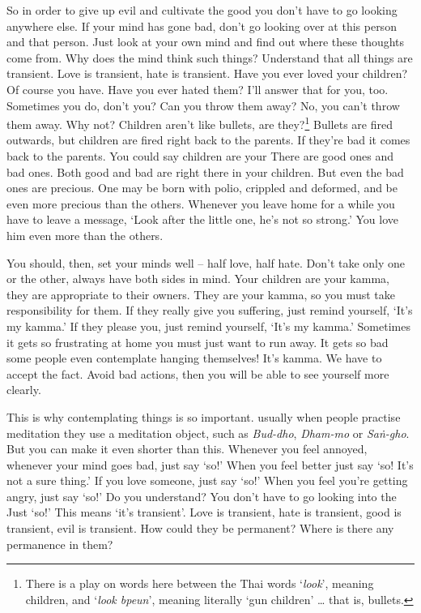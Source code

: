 So in order to give up evil and cultivate the good you don't have to go looking anywhere else. If your mind has gone bad, don't go looking over at this person and that person. Just look at your own mind and find out where these thoughts come from. Why does the mind think such things? Understand that all things are transient. Love is transient, hate is transient. Have you ever loved your children? Of course you have. Have you ever hated them? I'll answer that for you, too. Sometimes you do, don't you? Can you throw them away? No, you can't throw them away. Why not? Children aren't like bullets, are they?\footnote{There is a play on words here between the Thai words `\textit{look}', meaning children, and `\textit{look bpeun}', meaning literally `gun children' \ldots{} that is, bullets.} Bullets are fired outwards, but children are fired right back to the parents. If they're bad it comes back to the parents. You could say children are your  There are good ones and bad ones. Both good and bad are right there in your children. But even the bad ones are precious. One may be born with polio, crippled and deformed, and be even more precious than the others. Whenever you leave home for a while you have to leave a message, `Look after the little one, he's not so strong.' You love him even more than the others.

You should, then, set your minds well -- half love, half hate. Don't take only one or the other, always have both sides in mind. Your children are your kamma, they are appropriate to their owners. They are your kamma, so you must take responsibility for them. If they really give you suffering, just remind yourself, `It's my kamma.' If they please you, just remind yourself, `It's my kamma.' Sometimes it gets so frustrating at home you must just want to run away. It gets so bad some people even contemplate hanging themselves! It's kamma. We have to accept the fact. Avoid bad actions, then you will be able to see yourself more clearly.

This is why contemplating things is so important. usually when people practise meditation they use a meditation object, such as \textit{Bud-dho}, \textit{Dham-mo} or \textit{Sa\.n-gho}. But you can make it even shorter than this. Whenever you feel annoyed, whenever your mind goes bad, just say `so!' When you feel better just say `so! It's not a sure thing.' If you love someone, just say `so!' When you feel you're getting angry, just say `so!' Do you understand? You don't have to go looking into the  Just `so!' This means `it's transient'. Love is transient, hate is transient, good is transient, evil is transient. How could they be permanent? Where is there any permanence in them?

